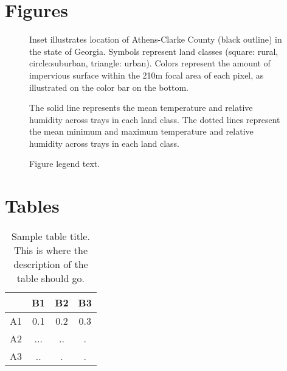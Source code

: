 \documentclass{bmcart}
\begin{document}
\begin{backmatter}


\section*{Figures}

\begin{figure}[h!]
  \label{Fig:map}
  \caption{
      Inset illustrates location of Athens-Clarke County (black outline) in the state of Georgia. Symbols represent land classes (square: rural, circle:suburban, triangle: urban). Colors represent the amount of impervious surface within the 210m focal area of each pixel, as illustrated on the color bar on the bottom.}
\end{figure}

\begin{figure}[h!]
  \label{Fig:climate}
  \caption{
      The solid line represents the mean temperature and relative humidity across trays in each land class. The dotted lines represent the mean minimum and maximum temperature and relative humidity across trays in each land class.}
\end{figure}

\begin{figure}[h!]
  \caption{
      Figure legend text.}
\end{figure}


\section*{Tables}
\begin{table}[h!]
\caption{Sample table title. This is where the description of the table should go.}
      \begin{tabular}{cccc}
        \hline
           & B1  &B2   & B3\\ \hline
        A1 & 0.1 & 0.2 & 0.3\\
        A2 & ... & ..  & .\\
        A3 & ..  & .   & .\\ \hline
      \end{tabular}
\end{table}


\end{backmatter}
\end{document}
